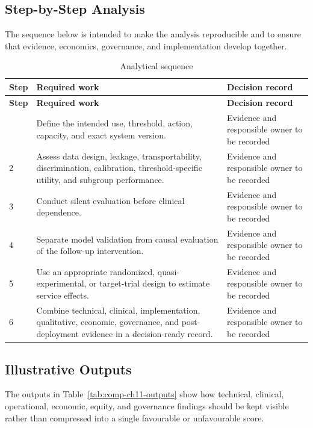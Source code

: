 \subsection{Step-by-Step Analysis}
The sequence below is intended to make the analysis reproducible and to ensure
that evidence, economics, governance, and implementation develop together.

\begin{longtable}{@{}p{}p{}p{}@{}}
\caption{Analytical sequence}
\label{tab:comp-ch11-analysis-steps}\\
\toprule
\textbf{Step} & \textbf{Required work} & \textbf{Decision record} \\
\midrule
\endfirsthead
\toprule
\textbf{Step} & \textbf{Required work} & \textbf{Decision record} \\
\midrule
\endhead
\bottomrule
\endlastfoot
1 & Define the intended use, threshold, action, capacity, and exact system version. & Evidence and responsible owner to be recorded \\
2 & Assess data design, leakage, transportability, discrimination, calibration, threshold-specific utility, and subgroup performance. & Evidence and responsible owner to be recorded \\
3 & Conduct silent evaluation before clinical dependence. & Evidence and responsible owner to be recorded \\
4 & Separate model validation from causal evaluation of the follow-up intervention. & Evidence and responsible owner to be recorded \\
5 & Use an appropriate randomized, quasi-experimental, or target-trial design to estimate service effects. & Evidence and responsible owner to be recorded \\
6 & Combine technical, clinical, implementation, qualitative, economic, governance, and post-deployment evidence in a decision-ready record. & Evidence and responsible owner to be recorded \\
\end{longtable}

\subsection{Illustrative Outputs}
The outputs in Table~\ref{tab:comp-ch11-outputs} show how technical,
clinical, operational, economic, equity, and governance findings should be kept
visible rather than compressed into a single favourable or unfavourable score.

